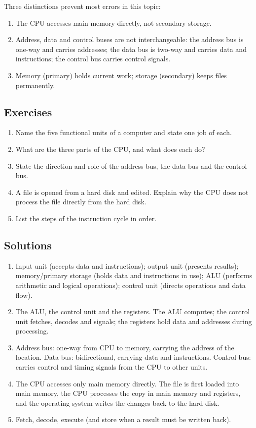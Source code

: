 \documentclass[11pt]{article}
\begin{document}
Three distinctions prevent most errors in this topic:
\begin{enumerate}
  \item The CPU accesses main memory directly, not secondary storage.
  \item Address, data and control buses are not interchangeable: the address
    bus is one-way and carries addresses; the data bus is two-way and carries
    data and instructions; the control bus carries control signals.
  \item Memory (primary) holds current work; storage (secondary) keeps files
    permanently.
\end{enumerate}

\subsection*{Exercises}
\begin{enumerate}[label=\arabic*.]
  \item Name the five functional units of a computer and state one job of
    each.
  \item What are the three parts of the CPU, and what does each do?
  \item State the direction and role of the address bus, the data bus and the
    control bus.
  \item A file is opened from a hard disk and edited. Explain why the CPU does
    not process the file directly from the hard disk.
  \item List the steps of the instruction cycle in order.
\end{enumerate}

\subsection*{Solutions}
\begingroup\small
\begin{enumerate}[label=\arabic*.]
  \item Input unit (accepts data and instructions); output unit (presents
    results); memory/primary storage (holds data and instructions in use);
    ALU (performs arithmetic and logical operations); control unit (directs
    operations and data flow).
  \item The ALU, the control unit and the registers. The ALU computes; the
    control unit fetches, decodes and signals; the registers hold data and
    addresses during processing.
  \item Address bus: one-way from CPU to memory, carrying the address of the
    location. Data bus: bidirectional, carrying data and instructions.
    Control bus: carries control and timing signals from the CPU to other
    units.
  \item The CPU accesses only main memory directly. The file is first loaded
    into main memory, the CPU processes the copy in main memory and registers,
    and the operating system writes the changes back to the hard disk.
  \item Fetch, decode, execute (and store when a result must be written back).
\end{enumerate}
\endgroup
\end{document}
